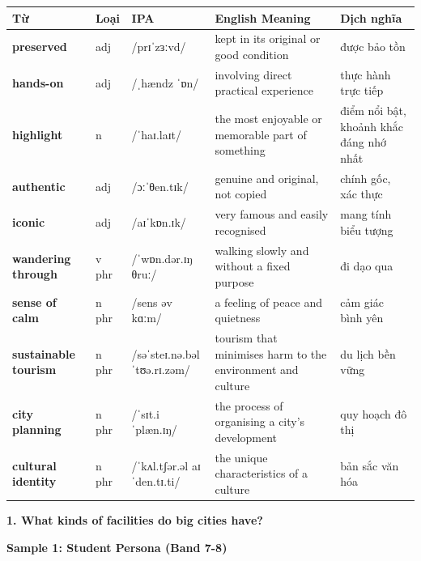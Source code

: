 

\vspace{0.8em}
\begin{center}
\renewcommand{\arraystretch}{1.65}
\begin{tabularx}{\textwidth}{|V{0.22\textwidth}|C{0.07\textwidth}|I{0.20\textwidth}|Y|V{0.18\textwidth}|}
\hline
{}
\textbf{Từ} & \textbf{Loại} & \textbf{IPA} & \textbf{English Meaning} & \textbf{Dịch nghĩa} \\
\hline
\textbf{preserved} & adj & /prɪˈzɜːvd/ & kept in its original or good condition & được bảo tồn \\ \hline
\textbf{hands-on} & adj & /ˌhændz ˈɒn/ & involving direct practical experience & thực hành trực tiếp \\ \hline
\textbf{highlight} & n & /ˈhaɪ.laɪt/ & the most enjoyable or memorable part of something & điểm nổi bật, khoảnh khắc đáng nhớ nhất \\ \hline
\textbf{authentic} & adj & /ɔːˈθen.tɪk/ & genuine and original, not copied & chính gốc, xác thực \\ \hline
\textbf{iconic} & adj & /aɪˈkɒn.ɪk/ & very famous and easily recognised & mang tính biểu tượng \\ \hline
\textbf{wandering through} & v phr & /ˈwɒn.dər.ɪŋ θruː/ & walking slowly and without a fixed purpose & đi dạo qua \\ \hline
\textbf{sense of calm} & n phr & /sens əv kɑːm/ & a feeling of peace and quietness & cảm giác bình yên \\ \hline
\textbf{sustainable tourism} & n phr & /səˈsteɪ.nə.bəl ˈtʊə.rɪ.zəm/ & tourism that minimises harm to the environment and culture & du lịch bền vững \\ \hline
\textbf{city planning} & n phr & /ˈsɪt.i ˈplæn.ɪŋ/ & the process of organising a city's development & quy hoạch đô thị \\ \hline
\textbf{cultural identity} & n phr & /ˈkʌl.tʃər.əl aɪˈden.tɪ.ti/ & the unique characteristics of a culture & bản sắc văn hóa \\ \hline
\end{tabularx}
\end{center}

\partthreeheader

\begin{ieltsquestion}
\textbf{1. What kinds of facilities do big cities have?}
\end{ieltsquestion}
\textbf{Sample 1: Student Persona (Band 7-8)}

